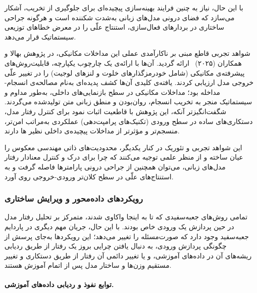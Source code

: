 با این حال، نیاز به چنین فرایند بهینه‌سازی پیچیده‌ای برای جلوگیری از تخریب، آشکار می‌سازد که فضای درونی مدل‌های زبانی به‌شدت شکننده است و هرگونه جراحی ساختاری در بردارهای فعال‌سازی، استنتاج علّی را در معرض خطاهای توزیعی سیستماتیک قرار می‌دهد.

شواهد تجربی قاطع مبنی بر ناکارآمدی عملی این مداخلات مکانیکی، در پژوهش بهالا و همکاران (۲۰۲۵)~\cite{bhalla2025unifying} ارائه گردید. آن‌ها با ارائه‌ی یک چارچوب یکپارچه، قابلیت‌روش‌های پیشرفته‌ی مکانیکی (شامل خودرمزگذارهای خلوت و لنزهای لوجیت) را در تغییر علّی خروجی مدل ارزیابی کردند. یافته‌ی کلیدی آن‌ها کشف پدیده‌ای به‌نام مصالحه‌ی انسجام-مداخله بود؛ مداخلات مکانیکی در سطح بازنمایی‌های داخلی، به‌طور مداوم و سیستماتیک منجر به تخریب انسجام، روان‌بودن و منطق زبانی متن تولیدشده می‌گردند. شگفت‌انگیزتر آنکه، این پژوهش با قاطعیت اثبات نمود برای کنترل رفتار مدل، دستکاری‌های ساده در سطح ورودی (تکنیک‌های پرامپت‌دهی) عملکردی به‌مراتب امن‌تر، منسجم‌تر و مؤثرتر از مداخلات پیچیده‌ی داخلی نظیر ها دارند.

این شواهد تجربی و تئوریک در کنار یکدیگر، محدودیت‌های ذاتی مهندسی معکوس را عیان ساخته و از منظر علمی توجیه می‌کنند که چرا برای درک و کنترل معنادار رفتار مدل‌های زبانی، می‌توان همچنین از جراحی درونی پارامترها فاصله گرفت و به استنتاج‌های علّی در سطح کلان‌تر ورودی-خروجی روی آورد.


\subsubsection{رویکردهای داده‌محور و ویرایش ساختاری}\label{sec:3-1-2-4}

تمامی روش‌های جعبه‌سفیدی که تا به اینجا واکاوی شدند، متمرکز بر تحلیل رفتار مدل در حین پردازش یک ورودی خاص بودند. با این حال، جریان مهم دیگری در پاردایم جعبه‌سفید وجود دارد که صورت‌مسئله را تغییر می‌دهد؛ این رویکردها به‌جای پرسش از چگونگی پردازش ورودی، به دنبال یافتن چرایی بروز یک رفتار از طریق ردیابی ریشه‌های آن در داده‌های آموزشی، و یا تغییر دائمی آن رفتار از طریق دستکاری و تغییر مستقیم وزن‌ها و ساختار مدل پس از اتمام آموزش هستند.

\paragraph{توابع نفوذ و ردیابی داده‌های آموزشی.}

